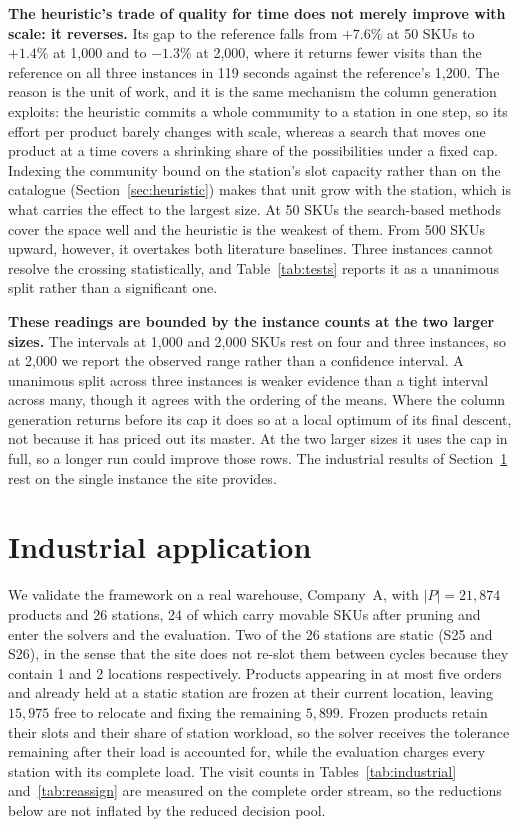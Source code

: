 \documentclass[]{interact}
\begin{document}
\textbf{The heuristic's trade of quality for time does not merely improve with scale: it reverses.} Its gap to the reference falls from $+7.6\%$ at 50 SKUs to $+1.4\%$ at 1,000 and to $-1.3\%$ at 2,000, where it returns fewer visits than the reference on all three instances in 119 seconds against the reference's 1,200. The reason is the unit of work, and it is the same mechanism the column generation exploits: the heuristic commits a whole community to a station in one step, so its effort per product barely changes with scale, whereas a search that moves one product at a time covers a shrinking share of the possibilities under a fixed cap. Indexing the community bound on the station's slot capacity rather than on the catalogue (Section~\ref{sec:heuristic}) makes that unit grow with the station, which is what carries the effect to the largest size. At 50 SKUs the search-based methods cover the space well and the heuristic is the weakest of them. From 500 SKUs upward, however, it overtakes both literature baselines. Three instances cannot resolve the crossing statistically, and Table~\ref{tab:tests} reports it as a unanimous split rather than a significant one.

\textbf{These readings are bounded by the instance counts at the two larger sizes.} The intervals at 1,000 and 2,000 SKUs rest on four and three instances, so at 2,000 we report the observed range rather than a confidence interval. A unanimous split across three instances is weaker evidence than a tight interval across many, though it agrees with the ordering of the means. Where the column generation returns before its cap it does so at a local optimum of its final descent, not because it has priced out its master. At the two larger sizes it uses the cap in full, so a longer run could improve those rows. The industrial results of Section~\ref{sec:industrial} rest on the single instance the site provides.


\section{Industrial application}\label{sec:industrial}
We validate the framework on a real warehouse, Company~A, with $|P| = 21{,}874$ products and 26 stations, 24 of which carry movable SKUs after pruning and enter the solvers and the evaluation. Two of the 26 stations are static (S25 and S26), in the sense that the site does not re-slot them between cycles because they contain 1 and 2 locations respectively. Products appearing in at most five orders and already held at a static station are frozen at their current location, leaving $15{,}975$ free to relocate and fixing the remaining $5{,}899$. Frozen products retain their slots and their share of station workload, so the solver receives the tolerance remaining after their load is accounted for, while the evaluation charges every station with its complete load. The visit counts in Tables~\ref{tab:industrial} and~\ref{tab:reassign} are measured on the complete order stream, so the reductions below are not inflated by the reduced decision pool.
\end{document}
